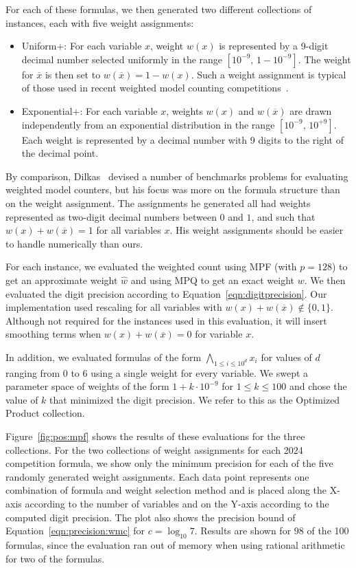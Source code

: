 \documentclass[letterpaper,USenglish,cleveref, autoref, thm-restate]{lipics-v2021}
\newcommand{\obar}[1]{\overline{#1}}
\newcommand{\approximate}[1]{\hat{#1}}
\newcommand{\approxw}{\approximate{w}}
\begin{document}
For each of these formulas, we then generated two different collections of instances, each with five weight assignments:
\begin{itemize}
\item \textsf{Uniform$+$}: For each variable $x$, weight $w(x)$ is represented by a 9-digit decimal number selected uniformly in the range
  $[10^{-9},\,1-10^{-9}]$. The weight for $\obar{x}$ is then set to
  $w(\obar{x}) = 1-w(x)$.  Such a weight assignment is typical of those used in recent weighted model counting competitions~\cite{fichte:jea:2020}.
\item \textsf{Exponential$+$}: For each variable $x$, weights $w(x)$ and $w(\obar{x})$
  are drawn independently from an exponential distribution in the range
  $[10^{-9},\,10^{+9}]$.  Each weight is represented by a decimal number with 9 digits to the right of the decimal point.
\end{itemize}

By comparison, Dilkas~\cite{dilkas:cpaior:2023} devised a number
of benchmarks problems for evaluating weighted model counters, but his
focus was more on the formula structure than on the weight
assignment.  The assignments he generated all had weights represented
as two-digit decimal numbers between $0$ and $1$, and such that $w(x)
+ w(\obar{x}) = 1$ for all variables $x$.  His weight
assignments should be easier to handle numerically than ours.

For each instance, we evaluated
the weighted count using MPF (with $p=128$) to get an approximate weight $\approxw$ and
using MPQ to get an exact weight $w$.  We then evaluated the digit precision according to Equation~\ref{eqn:digitprecision}.   Our implementation used rescaling for all variables
with $w(x) + w(\obar{x}) \not \in \{0, 1\}$.
Although not required for the instances used in this evaluation,
it will insert smoothing terms when $w(x) + w(\obar{x}) = 0$ for variable $x$.

In addition, we evaluated formulas of the form $\bigwedge_{1\leq i
  \leq 10^d} x_i$ for values of $d$ ranging from $0$ to $6$ using a
single weight for every variable.  We swept a parameter space of
weights of the form $1 + k\cdot 10^{-9}$ for $1 \leq k \leq 100$ and
chose the value of $k$ that minimized the digit precision.  We refer
to this as the \textsf{Optimized Product} collection.

Figure~\ref{fig:pos:mpf} shows the results of these evaluations for
the three collections.  For the two collections of weight assignments for each 2024 competition formula,
we show only the minimum precision for each of the five randomly
generated  weight assignments.  Each data point
represents one combination of formula and weight selection method and is placed
along the X-axis according to the number of variables
and on the Y-axis according to the computed digit precision.
The plot also shows the precision bound of Equation~\ref{eqn:precision:wmc} for $c=\log_{10} 7$.
Results are shown for 98 of the 100 formulas, since the evaluation ran out of memory when using rational arithmetic for two of the formulas.
\end{document}
